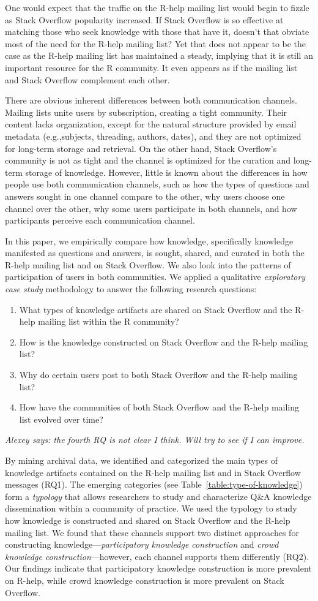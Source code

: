 \documentclass[smallextended]{svjour3}       %
\newcommand{\alexey}[1]{{\color{cyan}\emph{Alexey says: #1}}\xspace}
\newcommand{\alexey}[1]{}
\newcommand{\channel}{communication channel\xspace}
\newcommand{\channels}{communication channels\xspace}
\newcommand{\SO}{Stack Overflow\xspace}
\newcommand{\RH}{R-help\xspace}
\newcommand{\rqa}{What types of knowledge artifacts are shared on Stack Overflow and the R-help mailing list within the R community?}
\newcommand{\rqb}{How is the knowledge constructed on Stack Overflow and the R-help mailing list?}
\newcommand{\rqc}{Why do certain users post to both Stack Overflow and the R-help mailing list?}
\newcommand{\rqd}{How have the communities of both Stack Overflow and the R-help mailing list evolved over time?}
\begin{document}
One would expect that the traffic on the \RH mailing list would begin
to fizzle as \SO popularity increased. If \SO is so effective at
matching those who seek knowledge with those that have it, doesn't
that obviate most of the need for the \RH mailing list? Yet that does
not appear to be the case as the \RH mailing list has maintained a
steady, implying that it is still an important resource for the R
community. It even appears as if the mailing list and \SO complement
each other.

There are obvious inherent differences between both \channels. Mailing lists unite users by subscription, creating a tight community. Their content lacks organization, except for the natural structure provided by email metadata (e.g.,subjects, threading, authors, dates), and they are not optimized for long-term storage and retrieval. On the other hand, \SO's community is not as tight and the channel is optimized for the curation and long-term storage of knowledge. However, little is known about the differences in how people use both \channels, such as how the types of questions and answers sought in one channel compare to the other, why users choose one channel over the other, why some users participate in both channels, and how participants perceive each \channel.



In this paper, we empirically compare how
knowledge, specifically knowledge manifested as questions and answers,
is sought, shared, and curated in both the \RH mailing list and on
\SO.  We also look into the patterns of participation of users in both
communities. 
We applied a qualitative \textit{exploratory case study}
methodology to answer the following research questions:

\begin{enumerate}%
\item \rqa
\item \rqb
\item \rqc
\item \rqd
\end{enumerate}

\alexey{the fourth RQ is not clear I think. Will try to see if I can improve.}

By mining archival data, we identified and categorized the main types
of knowledge artifacts contained on the \RH mailing list and in \SO
messages (RQ1). The emerging categories (see
Table~\ref{table:type-of-knowledge}) form a \textit{typology} that
allows researchers to study and characterize Q\&A knowledge
dissemination within a community of practice. We used the typology to
study how knowledge is constructed and shared on \SO and the \RH
mailing list. We found that these channels support two distinct
approaches for constructing knowledge---\textit{participatory
  knowledge construction} and \textit{crowd knowledge
  construction}---however, each channel supports them differently
(RQ2). Our findings indicate that participatory knowledge construction
is more prevalent on \RH, while crowd knowledge construction is more
prevalent on \SO.
\end{document}
